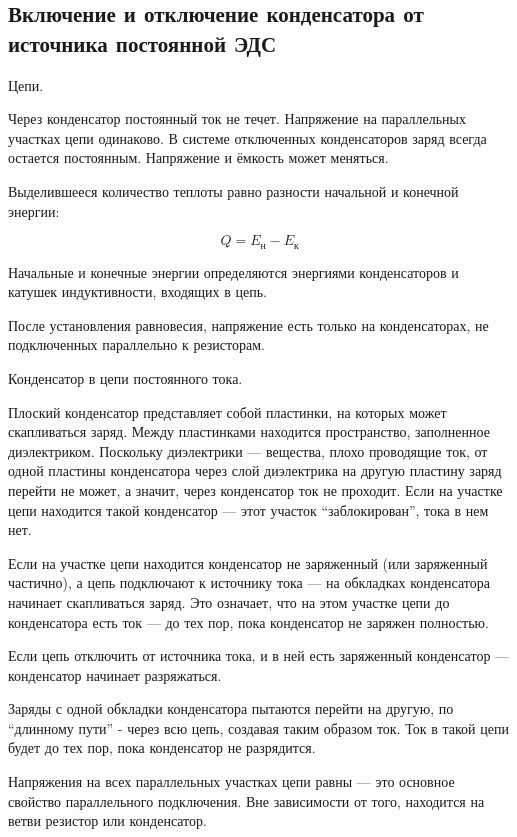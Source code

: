 \subsection{Включение и отключение конденсатора от источника постоянной ЭДС}

Цепи.

Через конденсатор постоянный ток не течет. Напряжение на параллельных участках цепи одинаково. 
В системе отключенных конденсаторов заряд всегда остается постоянным. Напряжение и ёмкость может меняться.

Выделившееся количество теплоты равно разности начальной и конечной энергии:

$$
Q=E_н-E_к
$$

Начальные и конечные энергии определяются энергиями конденсаторов и катушек индуктивности, входящих в цепь.

После установления равновесия, напряжение есть только на конденсаторах, не подключенных параллельно к резисторам.
\begin{definition}
    Конденсатор в цепи постоянного тока.

    Плоский конденсатор представляет собой пластинки, на которых может скапливаться заряд. 
    Между пластинками находится пространство, заполненное диэлектриком. Поскольку диэлектрики — вещества, 
    плохо проводящие ток, от одной пластины конденсатора через слой диэлектрика на другую пластину заряд 
    перейти не может, а значит, через конденсатор ток не проходит. Если на участке цепи находится такой конденсатор 
    — этот участок “заблокирован”, тока в нем нет.
\end{definition}

Если на участке цепи находится конденсатор не заряженный (или заряженный частично), а цепь подключают к источнику тока 
— на обкладках конденсатора начинает скапливаться заряд. Это означает, что на этом участке цепи до конденсатора есть 
ток — до тех пор, пока конденсатор не заряжен полностью.

\begin{remark}
    Если цепь отключить от источника тока, и в ней есть заряженный конденсатор — конденсатор начинает разряжаться.
\end{remark}

Заряды с одной обкладки конденсатора пытаются перейти на другую, по “длинному пути” - через всю цепь, создавая таким 
образом ток. Ток в такой цепи будет до тех пор, пока конденсатор не разрядится.

Напряжения на всех параллельных участках цепи равны — это основное свойство параллельного подключения. 
Вне зависимости от того, находится на ветви резистор или конденсатор.


